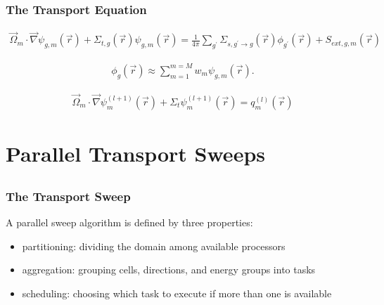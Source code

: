\documentclass[]{beamer}
\newcommand{\vr}{\vec{r}}
\newcommand{\vo}{\vec{\Omega}}
\begin{document}
\begin{frame}[t]\frametitle{The Transport Equation}
	\begin{block}{}
	\begin{align*}
	\vo_m \cdot \vec \nabla \psi_{g,m}(\vr) +\Sigma_{t,g}(\vr) \psi_{g,m}(\vr)  = \frac{1}{4\pi}\sum_{g^{\prime}}\Sigma_{s,g^{\prime}\to g}(\vr)\phi_{g^{\prime}}(\vr) + S_{ext,g,m}(\vr)
	\end{align*}
	\end{block}
	\begin{block}{}
	\begin{align*}
	\phi_g(\vr) \approx \sum_{m=1}^{m=M} w_m \psi_{g,m}(\vr).
	\end{align*}
	\end{block}
	\begin{block}{}
	\begin{align*}
	\vo_m \cdot \vec\nabla \psi_m^{(l+1)}(\vr) + \Sigma_t \psi_m^{(l+1)}(\vr) = q_m^{(l)}(\vr)
	\end{align*}
	\end{block}
\end{frame}

\section{Parallel Transport Sweeps}
\subsection{}
\begin{frame}[t]\frametitle{The Transport Sweep}
	\begin{block}{}
	A parallel sweep algorithm is defined by three properties:
	\begin{itemize}
		\item partitioning: dividing the domain among available processors
		\item aggregation: grouping cells, directions, and energy groups into tasks
		\item scheduling: choosing which task to execute if more than one is available
	\end{itemize}
	\end{block}
	
\end{frame}
\end{document}
